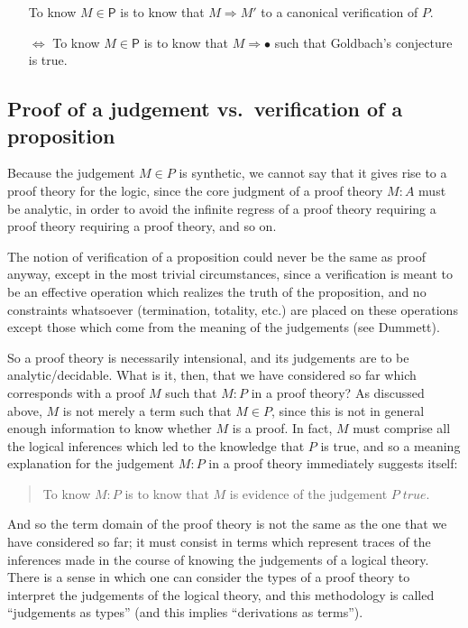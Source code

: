 \documentclass{amsart}
\theoremstyle{definition}
\theoremstyle{remark}
\numberwithin{equation}{section}
\newcommand\istrue[1]{\ensuremath{#1\;\mathit{true}}}
\newcommand\ver[2]{\ensuremath{#1\in#2}}
\newcommand\reduce[2]{\ensuremath{#1\Rightarrow#2}}
\begin{document}
\begin{itemize}
  \item[] To know \ver{M}{\mathsf{P}} is to know that \reduce{M}{M'} to a
    canonical verification of $P$.
  \item[$\Leftrightarrow$] To know $\ver{M}{\mathsf{P}}$ is to know that
    \reduce{M}{\bullet} such that Goldbach's conjecture is true.
\end{itemize}

\subsection{Proof of a judgement vs.\ verification of a proposition}

Because the judgement \ver{M}{P} is synthetic, we cannot say that it gives rise
to a proof theory for the logic, since the core judgment of a proof theory
$M:A$ must be analytic, in order to avoid the infinite regress of a proof
theory requiring a proof theory requiring a proof theory, and so on.

The notion of verification of a proposition could never be the same as proof
anyway, except in the most trivial circumstances, since a verification is meant
to be an effective operation which realizes the truth of the proposition, and
no constraints whatsoever (termination, totality, etc.) are placed on these
operations except those which come from the meaning of the judgements (see
Dummett).

So a proof theory is necessarily intensional, and its judgements are to be
analytic/decidable. What is it, then, that we have considered so far which
corresponds with a proof $M$ such that $M:P$ in a proof theory? As discussed
above, $M$ is not merely a term such that \ver{M}{P}, since this is not in
general enough information to know whether $M$ is a proof. In fact, $M$ must
comprise all the logical inferences which led to the knowledge that $P$ is
true, and so a meaning explanation for the judgement $M:P$ in a proof theory
immediately suggests itself:
\begin{quote}
  To know $M:P$ is to know that $M$ is evidence of the judgement \istrue{P}.
\end{quote}

And so the term domain of the proof theory is not the same as the one that we
have considered so far; it must consist in terms which represent traces of the
inferences made in the course of knowing the judgements of a logical theory.
There is a sense in which one can consider the types of a proof theory to
interpret the judgements of the logical theory, and this methodology is called
``judgements as types'' (and this implies ``derivations as terms'').
\end{document}
